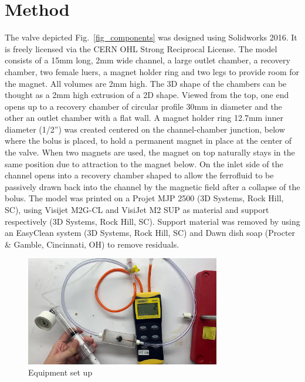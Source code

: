 \documentclass[]{asme2ej}
\begin{document}
\section{Method}

The valve depicted Fig.~\ref{fig_components}
was designed using Solidworks 2016.
It is freely licensed via the CERN OHL Strong Reciprocal License\cite{stuckey2021,stuckey2021stl}.
The model consists of a 15mm long, 2mm wide channel, a large outlet
chamber, a recovery chamber,
two female luers, a magnet holder ring and two legs to provide room
for the magnet.  All volumes are 2mm high.
The 3D shape
of the chambers can be thought as a 2mm high extrusion of a 2D shape.
Viewed from the top, one end opens up to a recovery
chamber of circular profile 30mm in diameter and the other
an outlet chamber with a flat wall.
A magnet holder ring 12.7mm inner diameter (1/2'') was created centered on the channel-chamber
junction, below where the bolus is placed, to hold a permanent magnet in place
at the center of the valve. When two magnets are used, the magnet on
top naturally stays in the same position due to attraction to the magnet below.
On the inlet side of the channel
opens into a recovery chamber shaped to allow the ferrofluid to be
passively drawn back into the channel by the magnetic field after a
collapse of the bolus.
The model was printed on a Projet MJP 2500 (3D
Systems, Rock Hill, SC), using Visijet M2G-CL and VisiJet M2 SUP as
material and support respectively (3D Systems, Rock Hill, SC). Support
material was removed by using an EasyClean system (3D Systems, Rock
Hill, SC) and Dawn dish soap (Procter \& Gamble, Cincinnati, OH) to
remove residuals.


\begin{figure}
\centerline{\includegraphics[width=3.34in]{figure/Figure2.jpeg}}
\caption{Equipment set up}
\label{fig_equipment}
\end{figure}
\end{document}
